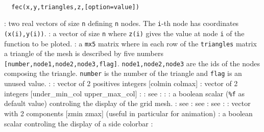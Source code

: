 
\begin{mandesc}
  \\
\end{mandesc}
\begin{calling_sequence}
\begin{verbatim}
  fec(x,y,triangles,z,[option=value])
\end{verbatim}
\end{calling_sequence}
\begin{parameters}
  \begin{varlist}
    : two real vectors of size \verb!n! defining \verb!n! nodes.
    The \verb!i!-th node has coordinates \verb!(x(i),y(i))!.
    : a vector of size \verb!n! where \verb!z(i)!
    gives the value at node \verb!i! of the function to be ploted.
    : a \verb!mx5! matrix where in each row of the \verb!triangles! matrix
    a triangle of the mesh is described by five numbers \verb![number,node1,node2,node3,flag]!.
    \verb!node1,node2,node3! are the ids of the nodes composing the triangle.
    \verb!number! is the number of the triangle and \verb!flag! is an unused value.
    :
    : vector of 2 positives integers [colmin colmax]
    : vector of 2 integers [under\_min\_col upper\_max\_col]
    :
    : see 
    :
    :
    : a boolean scalar (\verb!%f! as default value) controling the display of the grid mesh.
    : see 
    : see 
    : see 
    :
    : vector with 2 components [zmin zmax] (useful in particular for animation)
    : a boolean scalar controling the display of a side colorbar
    :
  \end{varlist}
\end{parameters}
